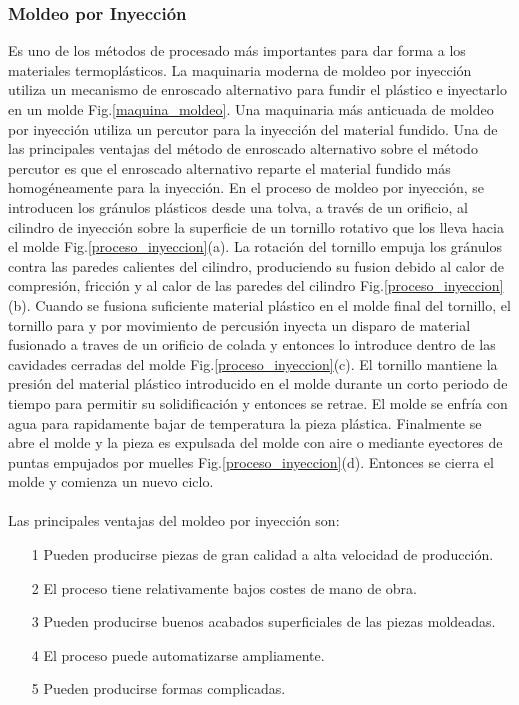 \documentclass[a4paper, 11pt]{article}
\begin{document}
\subsubsection{Moldeo por Inyección}
Es uno de los métodos de procesado más importantes para dar forma a los materiales termoplásticos. La maquinaria moderna de moldeo por inyección utiliza un mecanismo de enroscado alternativo para fundir el plástico e inyectarlo en un molde Fig.\ref{maquina_moldeo}. Una maquinaria más anticuada de moldeo por inyección utiliza un percutor para la inyección del material fundido. Una de las principales ventajas del método de enroscado alternativo sobre el método percutor es que el enroscado alternativo reparte el material fundido más homogéneamente para la inyección. En el proceso de moldeo por inyección, se introducen los gránulos plásticos desde una tolva, a través de un orificio, al cilindro de inyección sobre la superficie de un tornillo rotativo que los lleva hacia el molde Fig.\ref{proceso_inyeccion}(a). La rotación del tornillo empuja los gránulos contra las paredes calientes del cilindro, produciendo su fusion debido al calor de compresión, fricción y al calor de las paredes del cilindro Fig.\ref{proceso_inyeccion}    (b). Cuando se fusiona suficiente material plástico en el molde final del tornillo, el tornillo para y por movimiento de percusión inyecta un disparo de material fusionado a traves de un orificio de colada y entonces lo introduce dentro de las cavidades cerradas del molde Fig.\ref{proceso_inyeccion}(c). El tornillo mantiene la presión del material plástico introducido en el molde durante un corto periodo de tiempo para permitir su solidificación y entonces se retrae. El molde se enfría con agua para rapidamente bajar de temperatura la pieza plástica. Finalmente se abre el molde y la pieza es expulsada del molde con aire o mediante eyectores de puntas empujados por muelles Fig.\ref{proceso_inyeccion}(d). Entonces se cierra el molde y comienza un nuevo ciclo. \\
\\
Las principales ventajas del moldeo por inyección son:
\begin{itemize}
\item[1] Pueden producirse piezas de gran calidad a alta velocidad de producción.
\item[2] El proceso tiene relativamente bajos costes de mano de obra.
\item[3] Pueden producirse buenos acabados superficiales de las piezas moldeadas.
\item[4] El proceso puede automatizarse ampliamente.
\item[5] Pueden producirse formas complicadas.
\end{itemize}
\end{document}
